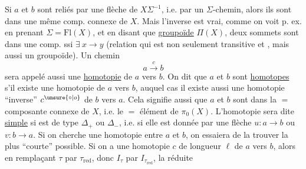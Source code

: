 Si $a$ et $b$  sont reliés par une flèche de $X\Sigma^{-1}$, i.e. par un $\Sigma$-chemin, alors ils sont dans une même comp. connexe de $X$. Mais l'inverse est  vrai, comme on voit p. ex. en prenant $\Sigma=\mathrm{Fl}(X)$, et en disant que  \uline{groupoïde} $\Pi(X)$,  deux sommets sont dans une  comp.
ssi $\exists\ x\longrightarrow y$ (relation qui est non seulement transitive et , mais aussi   un groupoïde). Un chemin
\[a\xrightarrow{c}b\]
sera appelé aussi une \uline{homotopie} de $a$ vers $b$. On dit que $a$ et $b$ sont \uline{homotopes} s'il existe une  homotopie  de $a$ vers $b$, auquel cas il existe aussi une homotopie  ``inverse'' $c^{\unsure{\circ|o}}$ de $b$ vers $a$. Cela signifie aussi que $a$ et $b$ sont dans la $=$ composante connexe de $X$, i.e.  le $=$ élément de $\pi_0(X)$.
L'homotopie sera dite \uline{simple} si  est de type $\Delta_+$ ou $\Delta_-$, i.e. si elle est donnée par une flèche $u:a\longrightarrow b$ ou $v:b\longrightarrow a$. Si on cherche une homotopie entre $a$ et $b$, on essaiera de la trouver la plus ``courte'' possible. Si on a une homotopie $c$ de longueur $\ell$ de $a$ vers $b$, alors en remplaçant $\tau$ par $\tau_{\mathrm{red}}$, donc $I_\tau$ par $I_{\tau_{\mathrm{red}}}$, la  réduite
